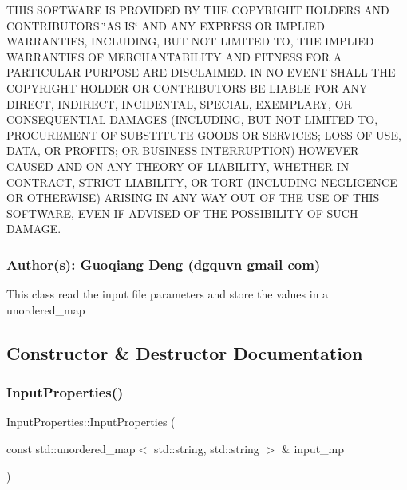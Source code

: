 T\+H\+IS S\+O\+F\+T\+W\+A\+RE IS P\+R\+O\+V\+I\+D\+ED BY T\+HE C\+O\+P\+Y\+R\+I\+G\+HT H\+O\+L\+D\+E\+RS A\+ND C\+O\+N\+T\+R\+I\+B\+U\+T\+O\+RS \char`\"{}\+A\+S I\+S\char`\"{} A\+ND A\+NY E\+X\+P\+R\+E\+SS OR I\+M\+P\+L\+I\+ED W\+A\+R\+R\+A\+N\+T\+I\+ES, I\+N\+C\+L\+U\+D\+I\+NG, B\+UT N\+OT L\+I\+M\+I\+T\+ED TO, T\+HE I\+M\+P\+L\+I\+ED W\+A\+R\+R\+A\+N\+T\+I\+ES OF M\+E\+R\+C\+H\+A\+N\+T\+A\+B\+I\+L\+I\+TY A\+ND F\+I\+T\+N\+E\+SS F\+OR A P\+A\+R\+T\+I\+C\+U\+L\+AR P\+U\+R\+P\+O\+SE A\+RE D\+I\+S\+C\+L\+A\+I\+M\+ED. IN NO E\+V\+E\+NT S\+H\+A\+LL T\+HE C\+O\+P\+Y\+R\+I\+G\+HT H\+O\+L\+D\+ER OR C\+O\+N\+T\+R\+I\+B\+U\+T\+O\+RS BE L\+I\+A\+B\+LE F\+OR A\+NY D\+I\+R\+E\+CT, I\+N\+D\+I\+R\+E\+CT, I\+N\+C\+I\+D\+E\+N\+T\+AL, S\+P\+E\+C\+I\+AL, E\+X\+E\+M\+P\+L\+A\+RY, OR C\+O\+N\+S\+E\+Q\+U\+E\+N\+T\+I\+AL D\+A\+M\+A\+G\+ES (I\+N\+C\+L\+U\+D\+I\+NG, B\+UT N\+OT L\+I\+M\+I\+T\+ED TO, P\+R\+O\+C\+U\+R\+E\+M\+E\+NT OF S\+U\+B\+S\+T\+I\+T\+U\+TE G\+O\+O\+DS OR S\+E\+R\+V\+I\+C\+ES; L\+O\+SS OF U\+SE, D\+A\+TA, OR P\+R\+O\+F\+I\+TS; OR B\+U\+S\+I\+N\+E\+SS I\+N\+T\+E\+R\+R\+U\+P\+T\+I\+ON) H\+O\+W\+E\+V\+ER C\+A\+U\+S\+ED A\+ND ON A\+NY T\+H\+E\+O\+RY OF L\+I\+A\+B\+I\+L\+I\+TY, W\+H\+E\+T\+H\+ER IN C\+O\+N\+T\+R\+A\+CT, S\+T\+R\+I\+CT L\+I\+A\+B\+I\+L\+I\+TY, OR T\+O\+RT (I\+N\+C\+L\+U\+D\+I\+NG N\+E\+G\+L\+I\+G\+E\+N\+CE OR O\+T\+H\+E\+R\+W\+I\+SE) A\+R\+I\+S\+I\+NG IN A\+NY W\+AY O\+UT OF T\+HE U\+SE OF T\+H\+IS S\+O\+F\+T\+W\+A\+RE, E\+V\+EN IF A\+D\+V\+I\+S\+ED OF T\+HE P\+O\+S\+S\+I\+B\+I\+L\+I\+TY OF S\+U\+CH D\+A\+M\+A\+GE.

\subsubsection*{Author(s)\+: Guoqiang Deng (dgquvn  gmail  com) }

This class read the input file parameters and store the values in a unordered\+\_\+map 

\subsection{Constructor \& Destructor Documentation}
\mbox{\label{a00634_ae1f6838f54d0f129c117973d4604cbf9}} 
\subsubsection{\texorpdfstring{Input\+Properties()}{InputProperties()}\hspace{0.1cm}{\footnotesize\ttfamily [1/2]}}
{\footnotesize\ttfamily Input\+Properties\+::\+Input\+Properties (\begin{DoxyParamCaption}\item[{const std\+::unordered\+\_\+map$<$ std\+::string, std\+::string $>$ \&}]{input\+\_\+mp }\end{DoxyParamCaption})}

